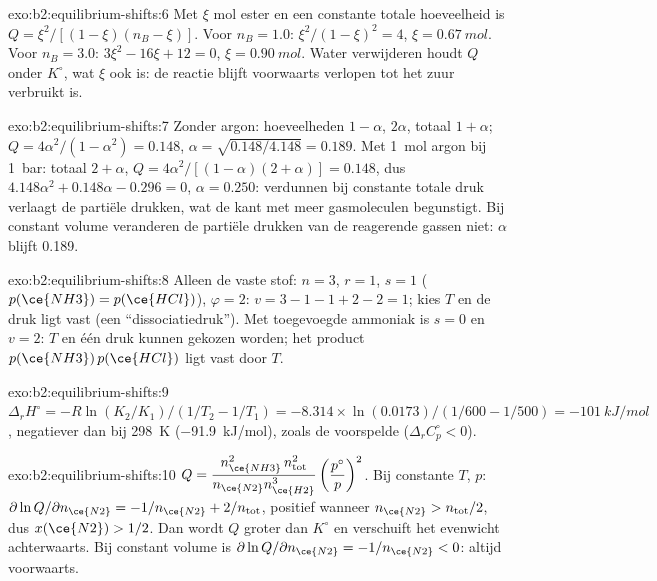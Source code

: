 \begin{solution}{exo:b2:equilibrium-shifts:6}
Met $\xi$ mol ester en een constante totale hoeveelheid is $Q =
\xi^2/[(1 - \xi)(n_B - \xi)]$. Voor $n_B = 1.0$: $\xi^2/(1 - \xi)^2 = 4$, $\xi
= \qty{0.67}{mol}$. Voor $n_B = 3.0$: $3\xi^2 - 16\xi + 12 = 0$, $\xi =
\qty{0.90}{mol}$. Water verwijderen houdt $Q$ onder $K^\circ$, wat $\xi$ ook is: de
reactie blijft voorwaarts verlopen tot het zuur verbruikt is.
\end{solution}

\begin{solution}{exo:b2:equilibrium-shifts:7}
Zonder argon: hoeveelheden $1 - \alpha$, $2\alpha$, totaal $1 + \alpha$;
$Q = 4\alpha^2/(1 - \alpha^2) = 0.148$, $\alpha = \sqrt{0.148/4.148} = 0.189$.
Met \qty{1}{mol} argon bij \qty{1}{bar}: totaal $2 + \alpha$, $Q =
4\alpha^2/[(1 - \alpha)(2 + \alpha)] = 0.148$, dus $4.148\alpha^2 + 0.148\alpha
- 0.296 = 0$, $\alpha = 0.250$: verdunnen bij constante totale druk verlaagt de
partiële drukken, wat de kant met meer gasmoleculen begunstigt. Bij
constant volume veranderen de partiële drukken van de reagerende gassen niet:
$\alpha$ blijft 0.189.
\end{solution}

\begin{solution}{exo:b2:equilibrium-shifts:8}
Alleen de vaste stof: $n = 3$, $r = 1$, $s = 1$ ($p(\ce{NH3}) = p(\ce{HCl})$),
$\varphi = 2$: $v = 3 - 1 - 1 + 2 - 2 = 1$; kies $T$ en de druk ligt
vast (een ``dissociatiedruk''). Met toegevoegde ammoniak is $s = 0$ en $v = 2$:
$T$ en één druk kunnen gekozen worden; het product $p(\ce{NH3})\,p(\ce{HCl})$ ligt
vast door $T$.
\end{solution}

\begin{solution}{exo:b2:equilibrium-shifts:9}
$\Delta_r H^\circ = -R\ln(K_2/K_1)/(1/T_2 - 1/T_1) = -8.314 \times
\ln(0.0173)/(1/600 - 1/500) = \qty{-101}{kJ/mol}$, negatiever dan bij
\qty{298}{K} (\qty{-91.9}{kJ/mol}), zoals de  voorspelde
($\Delta_r C_p^\circ < 0$).
\end{solution}

\begin{solution}{exo:b2:equilibrium-shifts:10}
$Q = \dfrac{n_{\ce{NH3}}^2\,n_{\text{tot}}^2}{n_{\ce{N2}}n_{\ce{H2}}^3}
\left(\dfrac{p^\circ}{p}\right)^2$. Bij constante $T$, $p$:
$\partial\ln Q/\partial n_{\ce{N2}} = -1/n_{\ce{N2}} + 2/n_{\text{tot}}$, positief
wanneer $n_{\ce{N2}} > n_{\text{tot}}/2$, dus $x(\ce{N2}) > 1/2$. Dan wordt $Q$
groter dan $K^\circ$ en verschuift het evenwicht achterwaarts. Bij constant volume is
$\partial\ln Q/\partial n_{\ce{N2}} = -1/n_{\ce{N2}} < 0$: altijd voorwaarts.
\end{solution}

